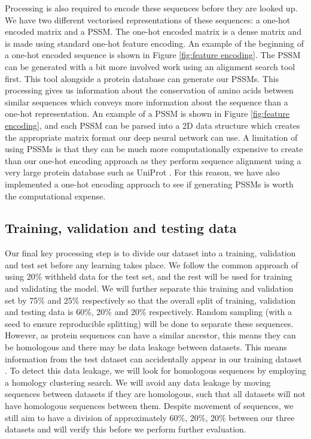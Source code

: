 \documentclass{l4proj}
\begin{document}
Processing is also required to encode these sequences before they are looked up. We have two different vectorised representations of these sequences: a one-hot encoded matrix and a PSSM. The one-hot encoded matrix is a dense matrix and is made using standard one-hot feature encoding. An example of the beginning of a one-hot encoded sequence is shown in Figure \ref{fig:feature encoding}. The PSSM can be generated with a bit more involved work using an alignment search tool first. This tool alongside a protein database can generate our PSSMs. This processing gives us information about the conservation of amino acids between similar sequences which conveys more information about the sequence than a one-hot representation. An example of a PSSM is shown in Figure \ref{fig:feature encoding}, and each PSSM can be parsed into a 2D data structure which creates the appropriate matrix format our deep neural network can use. A limitation of using PSSMs is that they can be much more computationally expensive to create than our one-hot encoding approach as they perform sequence alignment using a very large protein database such as UniProt \citep{uniprot:22}. For this reason, we have also implemented a one-hot encoding approach to see if generating PSSMs is worth the computational expense. 

\subsection{Training, validation and testing data}
\label{chap:design section:datasets}

Our final key processing step is to divide our dataset into a training, validation and test set before any learning takes place. We follow the common approach of using 20\% withheld data for the test set, and the rest will be used for training and validating the model. We will further separate this training and validation set by 75\% and 25\% respectively so that the overall split of training, validation and testing data is 60\%, 20\% and 20\% respectively. Random sampling (with a seed to ensure reproducible splitting) will be done to separate these sequences. However, as protein sequences can have a similar ancestor, this means they can be homologous and there may be data leakage between datasets. This means information from the test dataset can accidentally appear in our training dataset \citep{Cook:22}. To detect this data leakage, we will look for homologous sequences by employing a homology clustering search. We will avoid any data leakage by moving sequences between datasets if they are homologous, such that all datasets will not have homologous sequences between them. Despite movement of sequences, we still aim to have a division of approximately 60\%, 20\%, 20\% between our three datasets and will verify this before we perform further evaluation. 
\end{document}
